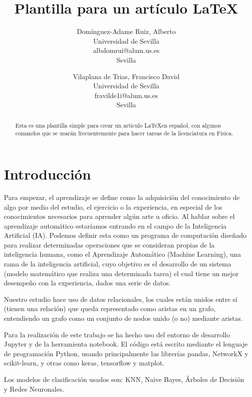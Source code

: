 \documentclass[12pt]{article}
\title{Plantilla para un artículo \LaTeX}
\author{
  Domínguez-Adame Ruiz, Alberto\\
  \small Universidad de Sevilla\\
  \small albdomrui@alum.us.es\\
  \small Sevilla
  \date{}
  \and
 Vilaplana de Trias, Francisco David\\
  \small Universidad de Sevilla\\
  \small fravilde1i@alum.us.es\\
  \small Sevilla
  \date{}
}
\newcommand\tab[1][1cm]{\hspace*{#1}}
\begin{document}


\maketitle




\begin{abstract}
Esta es una plantilla simple para crear un articulo \LaTeX en español, con algunos comandos que se usarán frecuentemente para hacer tareas de la licenciatura en Física.
\end{abstract}


\section{Introducci\'on}


\tab[0,65cm]Para empezar, el aprendizaje se define como la adquisición del conocimiento de algo por medio del estudio, el ejercicio o la experiencia, en especial de los conocimientos necesarios para aprender algún arte u oficio. Al hablar sobre el aprendizaje automático estaríamos entrando en el campo de la Inteligencia Artificial (IA). Podemos definir esta como un programa de computación diseñado para realizar determinadas operaciones que se consideran propias de la inteligencia humana, como el Aprendizaje Automático (Machine Learning), una rama de la inteligencia artificial, cuyo objetivo es el desarrollo de un sistema (modelo matemático que realiza una determinada tarea)  el cual tiene un mejor desempeño con la experiencia, dados una serie de datos.

Nuestro estudio hace uso de datos relacionales, los cuales están unidos entre sí (tienen una relación) que queda representado como aristas en un grafo, entendiendo un grafo como un conjunto de nodos unido (o no) mediante aristas.

Para la realización de este trabajo se ha hecho uso del entorno de desarrollo Jupyter y de la herramienta notebook. El código está escrito mediante el lenguaje de programación Python, usando principalmente las librerías pandas, NetworkX y scikit-learn, y otras como keras, tensorflow y matplot.


Los modelos de clasificación usados son: KNN, Naive Bayes, Árboles de Decisión y Redes Neuronales.
\end{document}

